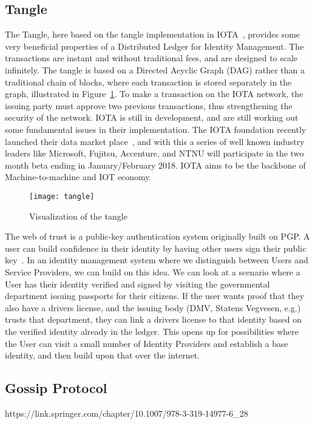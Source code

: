 \subsection{Tangle}

The Tangle, here based on the tangle implementation in IOTA~\cite{IOTA_Whitepaper}, provides some very beneficial properties of a Distributed Ledger for Identity Management. The transactions are instant and without traditional fees, and are designed to scale infinitely. The tangle is based on a Directed Acyclic Graph (DAG) rather than a traditional chain of blocks, where each transaction is stored separately in the graph, illustrated in Figure~\ref{fig:tangle}. To make a transaction on the IOTA network, the issuing party must approve two previous transactions, thus strengthening the security of the network. IOTA is still in development, and are still working out some fundamental issues in their implementation. The IOTA foundation recently launched their data market place~\cite{IOTA_Marketplace}, and with this a series of well known industry leaders like Microsoft, Fujitsu, Accenture, and NTNU will participate in the two month beta ending in January/February 2018. IOTA aims to be the backbone of Machine-to-machine and IOT economy.

\begin{figure}[ht]
    \centering
    \texttt{[image: tangle]}
    \caption{Visualization of the tangle \cite{IOTA_Whitepaper}}
    \label{fig:tangle}
\end{figure}
The web of trust is a public-key authentication system originally built on PGP. A user can build confidence in their identity by having other users sign their public key~\cite{Azouvi2017}. In an identity management system where we distinguish between Users and Service Providers, we can build on this idea. We can look at a scenario where a User has their identity verified and signed by visiting the governmental department issuing passports for their citizens. If the user wants proof that they also have a drivers license, and the issuing body (DMV, Statens Vegvesen, e.g.) trusts that department, they can link a drivers license to that identity based on the verified identity already in the ledger. This opens up for possibilities where the User can visit a small number of Identity Providers and establish a base identity, and then build upon that over the internet.

\subsection{Gossip Protocol}
https://link.springer.com/chapter/10.1007/978-3-319-14977-6\_28

